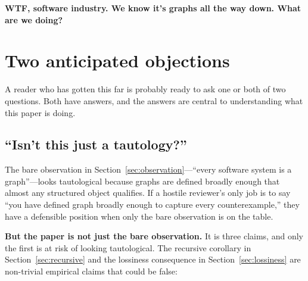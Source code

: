 \documentclass[11pt]{article}
\begin{document}
\textbf{WTF, software industry. We know it's graphs all the way down. What are we doing?}

\section{Two anticipated objections}
\label{sec:objections}

A reader who has gotten this far is probably ready to ask one or both of two questions. Both have answers, and the answers are central to understanding what this paper is doing.

\subsection*{``Isn't this just a tautology?''}

The bare observation in Section~\ref{sec:observation}---``every software system is a graph''---looks tautological because graphs are defined broadly enough that almost any structured object qualifies. If a hostile reviewer's only job is to say ``you have defined graph broadly enough to capture every counterexample,'' they have a defensible position when only the bare observation is on the table.

\textbf{But the paper is not just the bare observation.} It is three claims, and only the first is at risk of looking tautological. The recursive corollary in Section~\ref{sec:recursive} and the lossiness consequence in Section~\ref{sec:lossiness} are non-trivial empirical claims that could be false:
\end{document}
